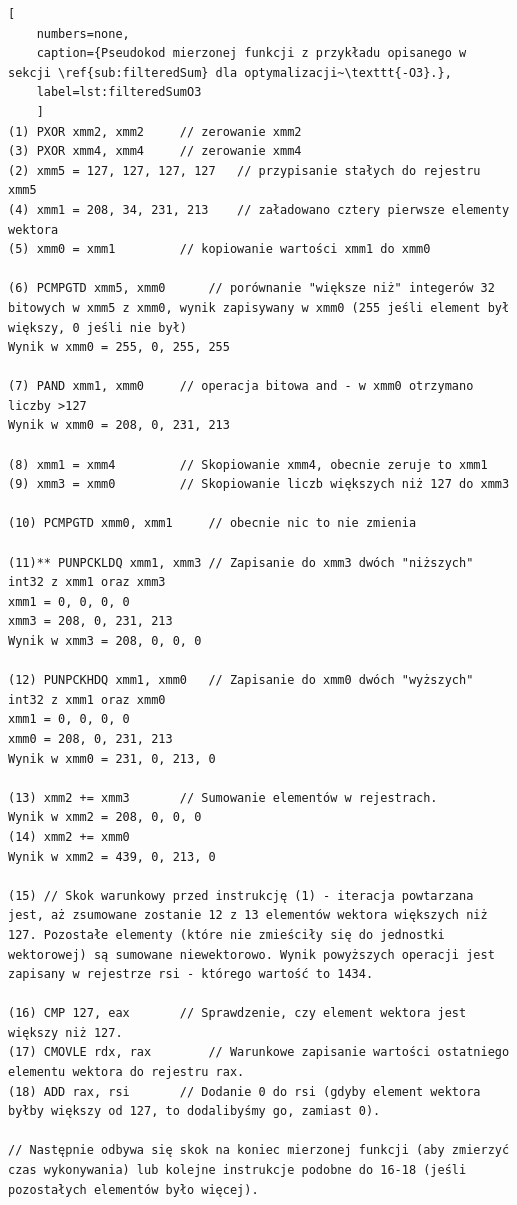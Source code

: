 \begin{lstlisting}[
    numbers=none,
    caption={Pseudokod mierzonej funkcji z przykładu opisanego w sekcji \ref{sub:filteredSum} dla optymalizacji~\texttt{-O3}.},
    label=lst:filteredSumO3
    ]
(1) PXOR xmm2, xmm2		// zerowanie xmm2
(3) PXOR xmm4, xmm4		// zerowanie xmm4
(2) xmm5 = 127, 127, 127, 127	// przypisanie stałych do rejestru xmm5
(4) xmm1 = 208, 34, 231, 213	// załadowano cztery pierwsze elementy wektora
(5) xmm0 = xmm1			// kopiowanie wartości xmm1 do xmm0

(6) PCMPGTD xmm5, xmm0		// porównanie "większe niż" integerów 32 bitowych w xmm5 z xmm0, wynik zapisywany w xmm0 (255 jeśli element był większy, 0 jeśli nie był)
Wynik w xmm0 = 255, 0, 255, 255

(7) PAND xmm1, xmm0		// operacja bitowa and - w xmm0 otrzymano liczby >127
Wynik w xmm0 = 208, 0, 231, 213

(8) xmm1 = xmm4			// Skopiowanie xmm4, obecnie zeruje to xmm1
(9) xmm3 = xmm0			// Skopiowanie liczb większych niż 127 do xmm3

(10) PCMPGTD xmm0, xmm1		// obecnie nic to nie zmienia

(11)** PUNPCKLDQ xmm1, xmm3	// Zapisanie do xmm3 dwóch "niższych" int32 z xmm1 oraz xmm3
xmm1 = 0, 0, 0, 0
xmm3 = 208, 0, 231, 213
Wynik w xmm3 = 208, 0, 0, 0

(12) PUNPCKHDQ xmm1, xmm0	// Zapisanie do xmm0 dwóch "wyższych" int32 z xmm1 oraz xmm0
xmm1 = 0, 0, 0, 0
xmm0 = 208, 0, 231, 213
Wynik w xmm0 = 231, 0, 213, 0

(13) xmm2 += xmm3		// Sumowanie elementów w rejestrach.
Wynik w xmm2 = 208, 0, 0, 0
(14) xmm2 += xmm0
Wynik w xmm2 = 439, 0, 213, 0

(15) // Skok warunkowy przed instrukcję (1) - iteracja powtarzana jest, aż zsumowane zostanie 12 z 13 elementów wektora większych niż 127. Pozostałe elementy (które nie zmieściły się do jednostki wektorowej) są sumowane niewektorowo. Wynik powyższych operacji jest zapisany w rejestrze rsi - którego wartość to 1434.

(16) CMP 127, eax		// Sprawdzenie, czy element wektora jest większy niż 127.
(17) CMOVLE rdx, rax		// Warunkowe zapisanie wartości ostatniego elementu wektora do rejestru rax.
(18) ADD rax, rsi		// Dodanie 0 do rsi (gdyby element wektora byłby większy od 127, to dodalibyśmy go, zamiast 0).

// Następnie odbywa się skok na koniec mierzonej funkcji (aby zmierzyć czas wykonywania) lub kolejne instrukcje podobne do 16-18 (jeśli pozostałych elementów było więcej).
\end{lstlisting}

